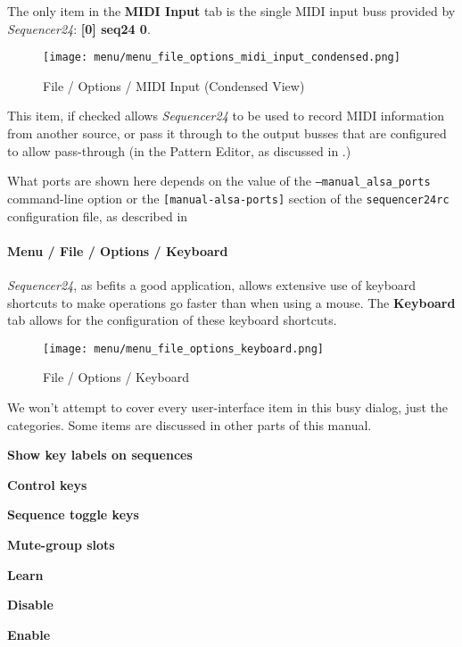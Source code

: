    The only item in the \textbf{MIDI Input} tab is the single MIDI input
   buss provided by \textsl{Sequencer24}:  \textbf{[0] seq24 0}.

\begin{figure}[H]
   \centering 
   \texttt{[image: menu/menu\_file\_options\_midi\_input\_condensed.png]}
   \caption{File / Options / MIDI Input (Condensed View)}
   \label{fig:seq24_menu_file_options_midi_input}
\end{figure}

   This item, if checked allows \textsl{Sequencer24} to be used to record MIDI
   information from another source, or pass it through to the output busses
   that are configured to allow pass-through
   (in the Pattern Editor, as discussed in 
   .)

   What ports are shown here depends on the value of the
   \texttt{--manual\_alsa\_ports} command-line option or the
   \texttt{[manual-alsa-ports]} section of the
   \texttt{sequencer24rc} configuration file, as described in

\paragraph{Menu / File / Options / Keyboard }
\label{paragraph:seq24_menu_file_options_keyboard}

   \textsl{Sequencer24}, as befits a good application, allows extensive use of
   keyboard shortcuts to make operations go faster than when using a mouse.
   The \textbf{Keyboard} tab allows for the configuration of these keyboard
   shortcuts.

\begin{figure}[H]
   \centering 
   \texttt{[image: menu/menu\_file\_options\_keyboard.png]}
   \caption{File / Options / Keyboard}
   \label{fig:seq24_menu_file_options_keyboard}
\end{figure}

   We won't attempt to cover every user-interface item in this busy
   dialog, just the categories.  Some items are discussed in other parts of
   this manual.

   \begin{enumber}
      \item \textbf{Show key labels on sequences}
      \item \textbf{Control keys}
      \item \textbf{Sequence toggle keys}
      \item \textbf{Mute-group slots}
      \item \textbf{Learn}
      \item \textbf{Disable}
      \item \textbf{Enable}
   \end{enumber}


